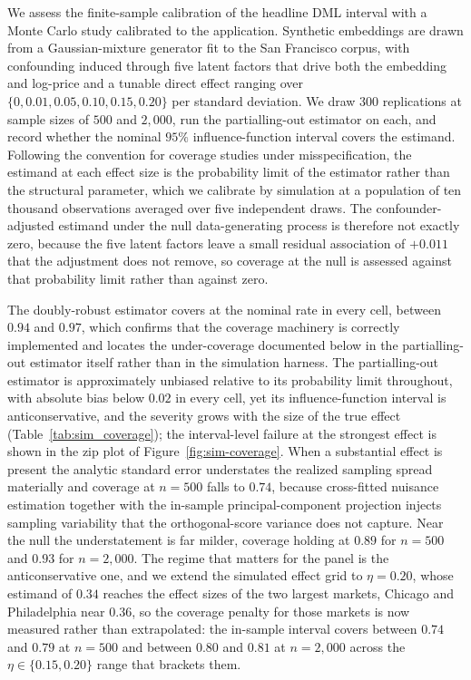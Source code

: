 \documentclass{article}
\begin{document}
We assess the finite-sample calibration of the headline DML interval with a Monte Carlo study calibrated to the application. Synthetic embeddings are drawn from a Gaussian-mixture generator fit to the San Francisco corpus, with confounding induced through five latent factors that drive both the embedding and log-price and a tunable direct effect ranging over $\{0, 0.01, 0.05, 0.10, 0.15, 0.20\}$ per standard deviation. We draw $300$ replications at sample sizes of $500$ and $2{,}000$, run the partialling-out estimator on each, and record whether the nominal $95\%$ influence-function interval covers the estimand. Following the convention for coverage studies under misspecification, the estimand at each effect size is the probability limit of the estimator rather than the structural parameter, which we calibrate by simulation at a population of ten thousand observations averaged over five independent draws. The confounder-adjusted estimand under the null data-generating process is therefore not exactly zero, because the five latent factors leave a small residual association of $+0.011$ that the adjustment does not remove, so coverage at the null is assessed against that probability limit rather than against zero.

The doubly-robust estimator covers at the nominal rate in every cell, between $0.94$ and $0.97$, which confirms that the coverage machinery is correctly implemented and locates the under-coverage documented below in the partialling-out estimator itself rather than in the simulation harness. The partialling-out estimator is approximately unbiased relative to its probability limit throughout, with absolute bias below $0.02$ in every cell, yet its influence-function interval is anticonservative, and the severity grows with the size of the true effect (Table~\ref{tab:sim_coverage}); the interval-level failure at the strongest effect is shown in the zip plot of Figure~\ref{fig:sim-coverage}. When a substantial effect is present the analytic standard error understates the realized sampling spread materially and coverage at $n = 500$ falls to $0.74$, because cross-fitted nuisance estimation together with the in-sample principal-component projection injects sampling variability that the orthogonal-score variance does not capture. Near the null the understatement is far milder, coverage holding at $0.89$ for $n = 500$ and $0.93$ for $n = 2{,}000$. The regime that matters for the panel is the anticonservative one, and we extend the simulated effect grid to $\eta = 0.20$, whose estimand of $0.34$ reaches the effect sizes of the two largest markets, Chicago and Philadelphia near $0.36$, so the coverage penalty for those markets is now measured rather than extrapolated: the in-sample interval covers between $0.74$ and $0.79$ at $n = 500$ and between $0.80$ and $0.81$ at $n = 2{,}000$ across the $\eta \in \{0.15, 0.20\}$ range that brackets them.
\end{document}
